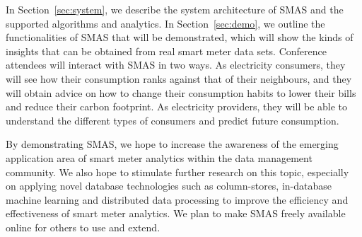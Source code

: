 \documentclass{sig-alternate}
\begin{document}
In Section~\ref{sec:system}, we describe the system architecture of SMAS and the supported algorithms and analytics.  In Section~\ref{sec:demo}, we outline the functionalities of SMAS that will be demonstrated, which will show the kinds of insights that can be obtained from real smart meter data sets.  Conference attendees will interact with SMAS in two ways.  As electricity consumers, they will see how their consumption ranks against that of their neighbours, and they will obtain advice on how to change their consumption habits to lower their bills and reduce their carbon footprint.  As electricity providers, they will be able to understand the different types of consumers and predict future consumption.

By demonstrating SMAS, we hope to increase the awareness of the emerging application area of smart meter analytics within the data management community.  We also hope to stimulate further research on this topic, especially on applying novel database technologies such as column-stores, in-database machine learning and distributed data processing to improve the efficiency and effectiveness of smart meter analytics.  We plan to make SMAS freely available online for others to use and extend. 

\end{document}
